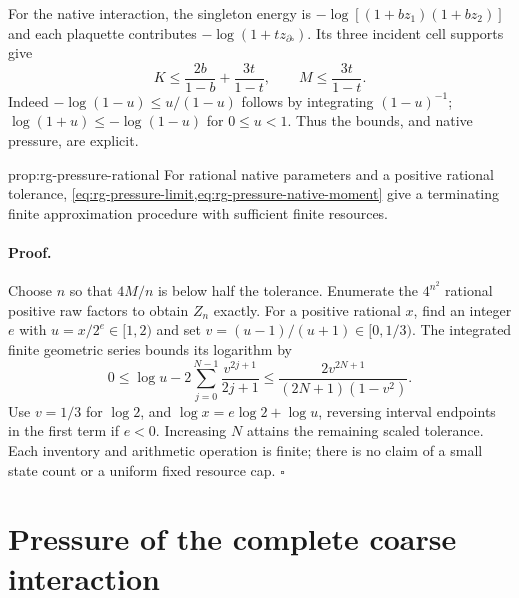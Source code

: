 For the native interaction, the singleton energy is
$-\log[(1+bz_1)(1+bz_2)]$ and each plaquette contributes
$-\log(1+tz_{\partial\square})$. Its three incident cell supports give
\begin{equation}
 K\leq\frac{2b}{1-b}+\frac{3t}{1-t},\qquad
 M\leq\frac{3t}{1-t}.
 \label{eq:rg-pressure-native-moment}
\end{equation}
Indeed $-\log(1-u)\leq u/(1-u)$ follows by integrating $(1-u)^{-1}$;
$\log(1+u)\leq-\log(1-u)$ for $0\leq u<1$.
Thus the bounds, and native pressure, are explicit.

{prop:rg-pressure-rational}
For rational native parameters and a positive rational tolerance,
\cref{eq:rg-pressure-limit,eq:rg-pressure-native-moment} give a terminating
finite approximation procedure with sufficient finite resources.

\paragraph{Proof.}
Choose $n$ so that $4M/n$ is below half the tolerance. Enumerate the
$4^{n^2}$ rational positive raw factors to obtain $Z_n$ exactly.
For a positive rational $x$, find an integer $e$ with $u=x/2^e\in[1,2)$
and set $v=(u-1)/(u+1)\in[0,1/3)$. The integrated finite geometric series
bounds its logarithm by
\begin{equation}
 0\leq\log u-2\sum_{j=0}^{N-1}\frac{v^{2j+1}}{2j+1}
 \leq\frac{2v^{2N+1}}{(2N+1)(1-v^2)}.
 \label{eq:rg-pressure-log-bound}
\end{equation}
Use $v=1/3$ for $\log2$, and $\log x=e\log2+\log u$, reversing interval
endpoints in the first term if $e<0$. Increasing $N$ attains the remaining
scaled tolerance. Each inventory and arithmetic operation is finite;
there is no claim of a small state count or a uniform fixed resource cap.
$\square$

\section{Pressure of the complete coarse interaction}
\label{sec:rg-pressure-coarse}


